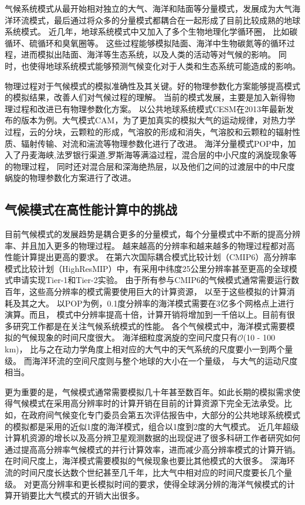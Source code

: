 气候系统模式从最开始相对独立的大气、海洋和陆面等分量模式，发展成为大气海洋环流模式，最后通过将众多的分量模式都耦合在一起形成了目前比较成熟的地球系统模式。
近几年，地球系统模式中又加入了多个生物地理化学循环圈， 比如碳循环、硫循环和臭氧圈等。
这些过程能够模拟陆面、海洋中生物碳氮等的循环过程，进而模拟出陆面、海洋等生态系统，以及人类的活动等对气候的影响。
同时，也使得地球系统模式能够预测气候变化对于人类和生态系统可能造成的影响。



物理过程对于气候模式的模拟准确性及其关键。好的物理参数化方案能够提高模式的模拟结果，改善人们对气候过程的理解。 
当前的模式发展，主要是加入新得物理过程和改进已有物理参数化方案。 
以公共地球系统模式CESM在2013年最新发布的版本\cite{hurrell2013community}为例。大气模式CAM，为了更加真实的模拟大气的运动规律，对热力学过程，云的分块，云颗粒的形成，气溶胶的形成和消失，气溶胶和云颗粒的辐射性质、辐射传输、对流和湍流等物理参数化进行了改进。
海洋分量模式POP中，加入了丹麦海峡,法罗银行渠道,罗斯海等满溢过程，混合层的中小尺度的涡旋现象等的物理过程， 同时还对混合层和深海绝热层，以及他们之间的过渡层中的中尺度蜗旋的物理参数化方案进行了改进。
 

\subsection{气候模式在高性能计算中的挑战}

目前气候模式的发展趋势是耦合更多的分量模式，每个分量模式中不断的提高分辨率、并且加入更多的物理过程。
越来越高的分辨率和越来越多的物理过程都对高性能计算提出更高的要求。 
在第六次国际耦合模式比较计划（CMIP6）高分辨率模式比较计划（HighResMIP）中，有采用中纬度25公里分辨率甚至更高的全球模式申请实现Tier-1和Tier-2实验。 
由于所有参与CMIP6的气候模式通常需要运行数百年，这些高分辨率的模式需要使用巨大的计算资源， 以至于这些模拟的计算消耗及其之大。
以POP为例，0.1度分辨率的海洋模式需要在3亿多个网格点上进行演算。而且，
模式中分辨率提高十倍，计算开销将增加到一千倍以上。目前有很多研究工作都是在关注气候系统模式的性能\cite{Worley:2011:PCE:2063384.2063457,dennis2012computational}。 
各个气候模式中，海洋模式需要模拟的气候现象的时间尺度很大。 
海洋细粒度涡旋的空间尺度只有$\mathcal{O}$(10 - 100 km)， 比与之在动力学角度上相对应的大气中的天气系统的尺度要小一到两个量级。
而海洋环流的空间尺度则与整个地球的大小在一个量级， 与大气的运动尺度相当。



更为重要的是，气候模式通常需要模拟几十年甚至数百年。如此长期的模拟需求使得气候模式在采用高分辨率时的计算开销在目前的计算资源下完全无法承受。比如，在政府间气候变化专门委员会第五次评估报告中，大部分的公共地球系统模式的模拟都是采用的近似1度的海洋模式，组合以1度到2度的大气模式。
近几年超级计算机资源的增长以及高分辨卫星观测数据的出现促进了很多科研工作者研究如何通过提高高分辨率气候模式的并行计算效率，进而减少高分辨率模式的计算开销。
在时间尺度上，海洋模式需要模拟的气候现象也要比其他模式的大很多。 深海环流的时间尺度长达数个世纪甚至几千年，比大气中相对应的时间尺度要长几个量级。
对更高分辨率和更长模拟时间的要求，使得全球涡分辨的海洋气候模式的计算开销要比大气模式的开销大出很多\cite{bryan2010frontal,mcclean2011prototype,graham2014importance}。

